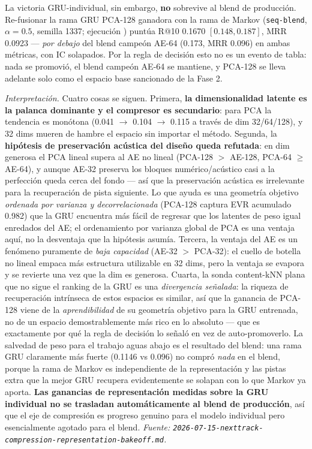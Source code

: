 \documentclass[11pt]{article}
\newcommand{\runid}[1]{\texttt{\small\seqsplit{#1}}}
\begin{document}
La victoria GRU-individual, sin embargo, \textbf{no} sobrevive al blend de
producción. Re-fusionar la rama GRU PCA-128 ganadora con la rama de Markov
(\texttt{seq-blend}, $\alpha{=}0.5$, semilla 1337; ejecución
\runid{run-20260715-044920-36dce}) puntúa R@10 \num{0.1670} $[0.148, 0.187]$, MRR
\num{0.0923} --- \emph{por debajo} del blend campeón AE-64 (\num{0.173}, MRR
\num{0.096}) en ambas métricas, con IC solapados. Por la regla de decisión esto no
es un evento de tabla: nada se promovió, el blend campeón AE-64 se mantiene, y
PCA-128 se lleva adelante solo como el espacio base sancionado de la Fase 2.

\emph{Interpretación.} Cuatro cosas se siguen. Primera, \textbf{la dimensionalidad
latente es la palanca dominante y el compresor es secundario}: para PCA la tendencia
es monótona (\num{0.041} $\to$ \num{0.104} $\to$ \num{0.115} a través de dim
32/64/128), y 32 dims mueren de hambre el espacio sin importar el método. Segunda,
la \textbf{hipótesis de preservación acústica del diseño queda refutada}: en dim
generosa el PCA lineal supera al AE no lineal (PCA-128 $>$ AE-128, PCA-64 $\ge$
AE-64), y aunque AE-32 preserva los bloques numérico/acústico casi a la perfección
queda cerca del fondo --- así que la preservación acústica es irrelevante para la
recuperación de pista siguiente. Lo que ayuda es una geometría objetivo
\emph{ordenada por varianza y decorrelacionada} (PCA-128 captura EVR acumulado
\num{0.982}) que la GRU encuentra más fácil de regresar que los latentes de peso
igual enredados del AE; el ordenamiento por varianza global de PCA es una ventaja
aquí, no la desventaja que la hipótesis asumía. Tercera, la ventaja del AE es un
fenómeno puramente de \emph{baja capacidad} (AE-32 $>$ PCA-32): el cuello de botella
no lineal empaca más estructura utilizable en 32 dims, pero la ventaja se evapora y
se revierte una vez que la dim es generosa. Cuarta, la sonda content-kNN plana que
no sigue el ranking de la GRU es una \emph{divergencia señalada}: la riqueza de
recuperación intrínseca de estos espacios es similar, así que la ganancia de PCA-128
viene de la \emph{aprendibilidad} de su geometría objetivo para la GRU entrenada, no
de un espacio demostrablemente más rico en lo absoluto --- que es exactamente por
qué la regla de decisión lo señaló en vez de auto-promoverlo. La salvedad de peso
para el trabajo aguas abajo es el resultado del blend: una rama GRU claramente más
fuerte (\num{0.1146} vs \num{0.096}) no compró \emph{nada} en el blend, porque la
rama de Markov es independiente de la representación y las pistas extra que la mejor
GRU recupera evidentemente se solapan con lo que Markov ya aporta. \textbf{Las
ganancias de representación medidas sobre la GRU individual no se trasladan
automáticamente al blend de producción}, así que el eje de compresión es progreso
genuino para el modelo individual pero esencialmente agotado para el blend.
\emph{Fuente:
\texttt{2026-07-15-nexttrack-compression-representation-bakeoff.md}.}
\end{document}
